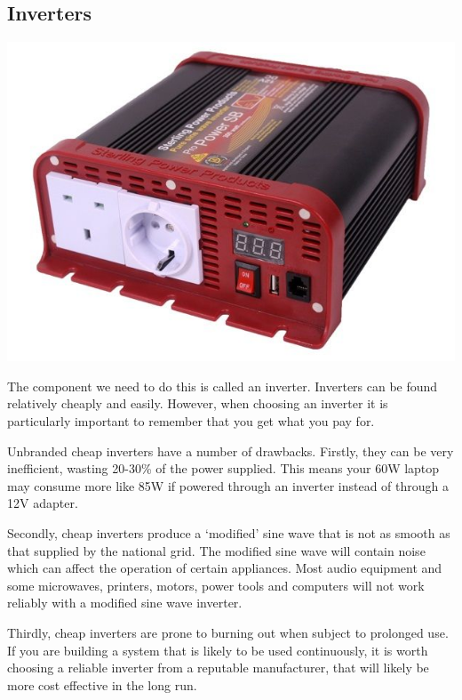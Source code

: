 \documentclass{article}
\theoremstyle{definition}
\theoremstyle{definition}
\theoremstyle{remark}
\begin{document}

  {\color{blue}\subsection{Inverters}} %
  \label{sub:inverters}

    \begin{center}
      \includegraphics[width=0.15\paperwidth]{../Images/image_10_1_(inverter).png}
    \end{center}
    
    The component we need to do this is called an inverter. Inverters can be found relatively cheaply and easily. However, when choosing an inverter it is particularly important to remember that you get what you pay for.

    Unbranded cheap inverters have a number of drawbacks. Firstly, they can be very inefficient, wasting 20-30\% of the power supplied. This means your 60W laptop may consume more like 85W if powered through an inverter instead of through a 12V adapter.

    Secondly, cheap inverters produce a ‘modified’ sine wave that is not as smooth as that supplied by the national grid. The modified sine wave will contain noise which can affect the operation of certain appliances. Most audio equipment and some microwaves, printers, motors, power tools and computers will not work reliably with a modified sine wave inverter.

    Thirdly, cheap inverters are prone to burning out when subject to prolonged use. If you are building a system that is likely to be used continuously, it is worth choosing a reliable inverter from a reputable manufacturer, that will likely be more cost effective in the long run.
\end{document}
